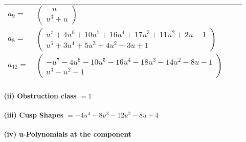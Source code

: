 \documentclass[1p]{elsarticle_modified}
\theoremstyle{definition}
\begin{document}
\begin{tabular}{m{7pt} m{180pt} m{7pt} m{180pt} }
\flushright $a_{9}=$&$\begin{pmatrix}- u\\u^3+u\end{pmatrix}$ \\
\flushright $a_{8}=$&$\begin{pmatrix}u^7+4 u^6+10 u^5+16 u^4+17 u^3+11 u^2+2 u-1\\u^5+3 u^4+5 u^3+4 u^2+3 u+1\end{pmatrix}$ \\
\flushright $a_{12}=$&$\begin{pmatrix}- u^7-4 u^6-10 u^5-16 u^4-18 u^3-14 u^2-8 u-1\\u^3- u^2-1\end{pmatrix}$\\&\end{tabular}
\flushleft \textbf{(ii) Obstruction class $= 1$}\\~\\
\flushleft \textbf{(iii) Cusp Shapes $= -4 u^4-8 u^3-12 u^2-8 u+4$}\\~\\
\newpage\renewcommand{\arraystretch}{1}
\flushleft \textbf{(iv) u-Polynomials at the component}\newline \\
\end{document}

